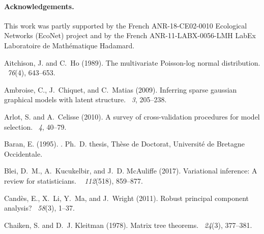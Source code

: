 \documentclass{article}                     %
\begin{document}
\paragraph{Acknowledgements.} 
This work was partly supported by the French ANR-18-CE02-0010 Ecological Networks (EcoNet) project and by the French ANR-11-LABX-0056-LMH LabEx Laboratoire de Mathématique Hadamard.
\begin{thebibliography}{}

Aitchison, J. and C.~Ho (1989).
\newblock The multivariate {P}oisson-log normal distribution.
~{\em 76\/}(4), 643--653.

Ambroise, C., J.~Chiquet, and C.~Matias (2009).
\newblock Inferring sparse gaussian graphical models with latent structure.
~{\em 3}, 205--238.

Arlot, S. and A.~Celisse (2010).
\newblock A survey of cross-validation procedures for model selection.
~{\em 4}, 40--79.

Baran, E. (1995).
.
\newblock Ph.\ D. thesis, Th{\`e}se de Doctorat, Universit{\'e} de Bretagne
  Occidentale.

{Blei}, D.~M., A.~{Kucukelbir}, and J.~D. {McAuliffe} (2017).
\newblock Variational inference: A review for statisticians.
~{\em
  112\/}(518), 859--877.

Cand{\`e}s, E., X.~Li, Y.~Ma, and J.~Wright (2011).
\newblock Robust principal component analysis?
~{\em 58\/}(3), 1--37.

Chaiken, S. and D.~J. Kleitman (1978).
\newblock Matrix tree theorems.
~{\em 24\/}(3),
  377--381.


\end{thebibliography}
\end{document}

